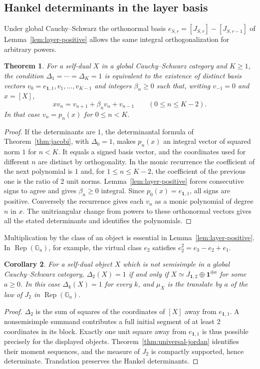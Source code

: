 \documentclass[11pt,reqno]{amsart}
\newtheorem{theorem}{Theorem}[section]
\newtheorem{corollary}[theorem]{Corollary}
\theoremstyle{definition}
\newcommand{\one}{\mathbf 1}
\newcommand{\Ga}{\mathbb G_a}
\newcommand{\Rep}{\operatorname{Rep}}
\begin{document}
\subsection{Hankel determinants in the layer basis}
Under global Cauchy--Schwarz the orthonormal basis
$e_{S,r}=[J_{S,r}]-[J_{S,r-1}]$ of Lemma~\ref{lem:layer-positive}
allows the same integral orthogonalization for arbitrary powers.

\begin{theorem}\label{thm:layer-path}
For a self-dual $X$ in a global Cauchy--Schwarz category and $K\geq1$,
the condition $\Delta_1=\cdots=\Delta_K=1$ is equivalent to the existence
of distinct basis vectors $v_0=e_{\one,1},v_1,\ldots,v_{K-1}$ and
integers $\beta_n\geq0$ such that, writing $v_{-1}=0$ and $x=[X]$,
\[
 xv_n=v_{n+1}+\beta_n v_n+v_{n-1}\qquad (0\leq n\leq K-2).
\]
In that case $v_n=p_n(x)$ for $0\leq n<K$.
\end{theorem}
\begin{proof}
If the determinants are $1$, the determinantal formula of
Theorem~\ref{thm:jacobi}, with $\Delta_0=1$, makes $p_n(x)$ an integral
vector of squared norm $1$ for $n<K$. It equals a signed basis vector,
and the coordinates used for different $n$ are distinct by orthogonality.
In the monic recurrence the coefficient of the next polynomial is $1$
and, for $1\leq n\leq K-2$, the coefficient of the previous one is the
ratio of 2 unit norms. Lemma~\ref{lem:layer-positive} forces consecutive
signs to agree and gives $\beta_n\geq0$ integral. Since $p_0(x)=e_{\one,1}$,
all signs are positive. Conversely the recurrence gives each $v_n$ as
a monic polynomial of degree $n$ in $x$. The unitriangular change from powers
to these orthonormal vectors gives all the stated determinants and identifies
the polynomials.
\end{proof}

Multiplication by the class of an object is essential in Lemma~\ref{lem:layer-positive}.
In $\Rep(\Ga)$, for example, the virtual class $e_2$ satisfies $e_2^2=e_3-e_2+e_1$.

\begin{corollary}\label{cor:variance-one}
For a self-dual object $X$ which is not semisimple in a global Cauchy--Schwarz
category, $\Delta_2(X)=1$ if and only if
$X\simeq J_{\one,2}\oplus\one^{\oplus a}$ for some $a\geq0$.
In this case $\Delta_k(X)=1$ for every $k$, and $\mu_X$ is the translate
by $a$ of the law of $J_2$ in $\Rep(\Ga)$.
\end{corollary}
\begin{proof}
$\Delta_2$ is the sum of squares of the coordinates of $[X]$ away from
$e_{\one,1}$. A nonsemisimple summand contributes a full initial segment of
at least 2 coordinates in its block. Exactly one unit square away from
$e_{\one,1}$ is thus possible precisely for the displayed objects.
Theorem~\ref{thm:universal-jordan} identifies their moment sequences, and
the measure of $J_2$ is compactly supported, hence determinate. Translation
preserves the Hankel determinants.
\end{proof}
\end{document}
